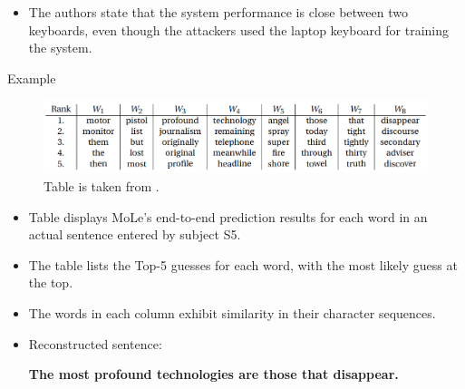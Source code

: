\documentclass[ucs,9pt]{beamer}
\begin{document}
\begin{frame}
\begin{itemize}
	
	\item  The authors state that the system performance is close between two keyboards, even though 	the attackers used the laptop keyboard for training the system. 
	
 \end{itemize}
 \end{frame}
 


\begin{frame}{Example}
	\begin{figure}
		\centering
		\includegraphics[width=\linewidth]{imgs/sentence.png}
		\caption{Table is taken from \cite{b1}.}
	\end{figure}

\begin{itemize}
 	\item Table displays MoLe's end-to-end prediction results for each word in an actual sentence entered by subject S5. 
 	\item The table lists the Top-5 guesses for each word, with the most likely guess at the top. \item The words in each column exhibit similarity in their character sequences. 
 	\pause 
 	\item Reconstructed sentence:
 	
 	 \textbf{\alert{The most profound technologies are those that disappear.}}

\end{itemize}
\end{frame}
\end{document}
